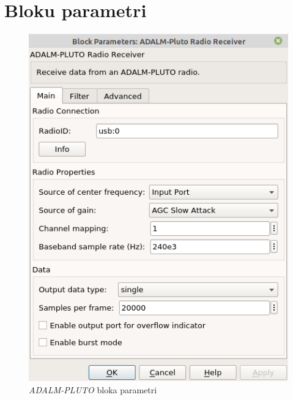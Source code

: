 \documentclass[a4paper,12pt]{extarticle}    %
\begin{document}
\section{Bloku parametri}
%
\begin{figure}[H]
  	 \centering
  		\includegraphics[trim={0cm 0cm 0cm 0cm},clip, angle=0, width=0.5\linewidth ]{pictures/adalm-pluto.png}
  		\caption{\textit{ADALM-PLUTO} bloka parametri}\label{fig:pluto}
\end{figure}
%
%
\end{document}
